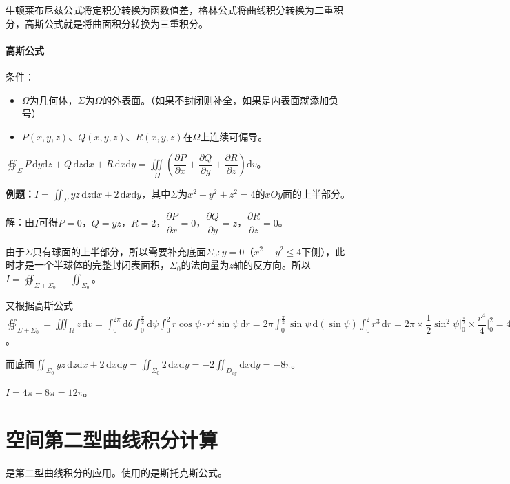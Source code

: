 \documentclass[UTF8, 12pt]{ctexart}
\begin{document}
牛顿莱布尼兹公式将定积分转换为函数值差，格林公式将曲线积分转换为二重积分，高斯公式就是将曲面积分转换为三重积分。

\paragraph{高斯公式} \leavevmode \medskip

条件：

\begin{itemize}
    \item $\Omega$为几何体，$\Sigma$为$\Omega$的外表面。（如果不封闭则补全，如果是内表面就添加负号）
    \item $P(x,y,z)$、$Q(x,y,z)$、$R(x,y,z)$在$\Omega$上连续可偏导。
\end{itemize}

$\displaystyle{\oiint_\Sigma P\,\textrm{d}y\textrm{d}z+Q\,\textrm{d}z\textrm{d}x+R\,\textrm{d}x\textrm{d}y=\iiint\limits_\Omega\left(\dfrac{\partial P}{\partial x}+\dfrac{\partial Q}{\partial y}+\dfrac{\partial R}{\partial z}\right)\textrm{d}v}$。

\textbf{例题：}$I=\iint_\Sigma yz\,\textrm{d}z\textrm{d}x+2\,\textrm{d}x\textrm{d}y$，其中$\Sigma$为$x^2+y^2+z^2=4$的$xOy$面的上半部分。

解：由$I$可得$P=0$，$Q=yz$，$R=2$，$\dfrac{\partial P}{\partial x}=0$，$\dfrac{\partial Q}{\partial y}=z$，$\dfrac{\partial R}{\partial z}=0$。

由于$\Sigma$只有球面的上半部分，所以需要补充底面$\Sigma_0:y=0$（$x^2+y^2\leqslant4$下侧），此时才是一个半球体的完整封闭表面积，$\Sigma_0$的法向量为$z$轴的反方向。所以$I=\oiint_{\Sigma+\Sigma_0}-\iint_{\Sigma_0}$。

又根据高斯公式$\oiint_{\Sigma+\Sigma_0}=\iiint_\Omega z\,\textrm{d}v=\int_0^{2\pi}\textrm{d}\theta\int_0^{\frac{\pi}{2}}\textrm{d}\psi\int_0^2r\cos\psi\cdot r^2\sin\psi\,\textrm{d}r=2\pi\int_0^{\frac{\pi}{2}}\sin\psi\,\textrm{d}(\sin\psi)\int_0^2r^3\,\textrm{d}r=2\pi\times\dfrac{1}{2}\sin^2\psi\vert_0^{\frac{\pi}{2}}\times\dfrac{r^4}{4}\vert_0^2=4\pi$。

而底面$\iint_{\Sigma_0}yz\,\textrm{d}z\textrm{d}x+2\,\textrm{d}x\textrm{d}y=\iint_{\Sigma_0}2\,\textrm{d}x\textrm{d}y=-2\iint_{D_{xy}}\textrm{d}x\textrm{d}y=-8\pi$。

$I=4\pi+8\pi=12\pi$。

\section{空间第二型曲线积分计算}

是第二型曲线积分的应用。使用的是斯托克斯公式。
\end{document}
